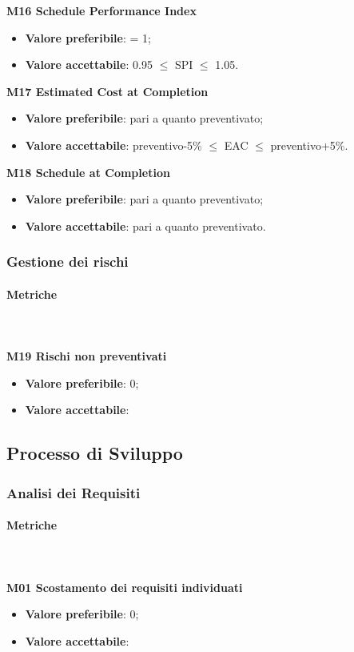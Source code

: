 				\textbf{M16 Schedule Performance Index}
				\begin{itemize}
					\item \textbf{Valore preferibile}: = 1;
					\item \textbf{Valore accettabile}: 0.95 $\le$ SPI $\le$ 1.05.
				\end{itemize}
				\textbf{M17 Estimated Cost at Completion}
				\begin{itemize}
					\item \textbf{Valore preferibile}: pari a quanto preventivato;
					\item \textbf{Valore accettabile}: preventivo-5\% $\le$ EAC $\le$ preventivo+5\%.
				\end{itemize}
				\textbf{M18 Schedule at Completion}
				\begin{itemize}
					\item \textbf{Valore preferibile}: pari a quanto preventivato;
					\item \textbf{Valore accettabile}: pari a quanto preventivato.
				\end{itemize}
			
		\subsubsection{Gestione dei rischi} 
			\paragraph{Metriche} \mbox{} \\ \\
			\textbf{M19 Rischi non preventivati} 
			\begin{itemize}
				\item \textbf{Valore preferibile}: 0;
				\item \textbf{Valore accettabile}: 
			\end{itemize}
				
											
	\subsection{Processo di Sviluppo}
		\subsubsection{Analisi dei Requisiti} 
			\paragraph{Metriche} \mbox{} \\ \\
				\textbf{M01 Scostamento dei requisiti individuati} 
				\begin{itemize}
					\item \textbf{Valore preferibile}: 0;
					\item \textbf{Valore accettabile}: 
				\end{itemize}
			
